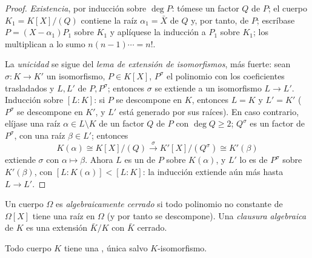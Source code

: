 \begin{proof}
\emph{Existencia}, por inducción sobre $\deg P$: tómese un factor
 $Q$ de $P$; el cuerpo
$K_1 = K[X]/(Q)$ contiene la raíz $\alpha_1 = \bar X$ de $Q$ y, por
tanto, de $P$; escríbase $P = (X -
\alpha_1)P_1$ sobre $K_1$ y aplíquese la inducción a $P_1$ sobre $K_1$;
los  multiplican a lo sumo
$n(n-1)\cdots = n!$.

La \emph{unicidad} se sigue del \emph{lema de extensión de
isomorfismos}, más fuerte: sean $\sigma \colon K \to K'$ un isomorfismo,
$P \in K[X]$, $P^\sigma$ el polinomio con los coeficientes trasladados y
$L, L'$  de
$P, P^\sigma$; entonces $\sigma$ se extiende a un isomorfismo
$L \to L'$. Inducción sobre $[L:K]$: si $P$ se descompone en $K$,
entonces $L = K$ y $L' = K'$ ($P^\sigma$ se descompone en $K'$, y $L'$
está generado por sus raíces). En caso contrario, elíjase una raíz
$\alpha \in L \setminus K$ de un factor
 $Q$ de $P$ con
$\deg Q \geq 2$; $Q^\sigma$ es un factor
 de $P^\sigma$, con una
raíz $\beta \in L'$; entonces
\[
K(\alpha) \cong K[X]/(Q) \xrightarrow{\ \sigma\ }
K'[X]/(Q^\sigma) \cong K'(\beta)
\]
extiende $\sigma$ con $\alpha \mapsto \beta$. Ahora $L$ es un
 de $P$ sobre
$K(\alpha)$, y $L'$ lo es de $P^\sigma$ sobre $K'(\beta)$, con
$[L : K(\alpha)] < [L:K]$: la inducción extiende aún más hasta
$L \to L'$.
\end{proof}

\begin{definition}\label{def:b3:galois:closure}
Un cuerpo $\Omega$ es \emph{algebraicamente cerrado} si todo polinomio no constante de $\Omega[X]$
tiene una raíz en $\Omega$ (y por tanto se descompone). Una
\emph{clausura algebraica} de $K$ es una
extensión  $\bar K/K$ con
$\bar K$  cerrado.
\end{definition}

\begin{theorem}[Steinitz]\label{thm:b3:galois:steinitz}
Todo cuerpo $K$ tiene una , única salvo $K$-isomorfismo.
\end{theorem}


